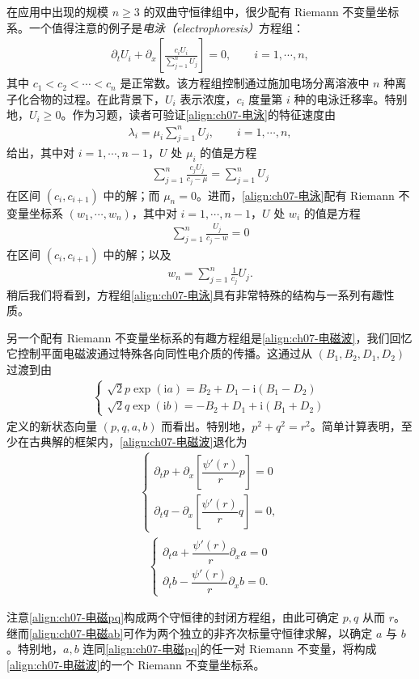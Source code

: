 \documentclass[../../main.tex]{subfiles}
\begin{document}
在应用中出现的规模 $n\geqslant 3$ 的双曲守恒律组中，很少配有 Riemann 不变量坐标系。一个值得注意的例子是\emph{电泳（electrophoresis）}方程组：
\begin{align}
\partial_t U_i+\partial_x\left[\frac{c_i U_i}{\sum_{j=1}^n U_j}\right]=0,\qquad i=1,\cdots,n,
\label{align:ch07-电泳}
\end{align}
其中 $c_1<c_2<\cdots<c_n$ 是正常数。该方程组控制通过施加电场分离溶液中 $n$ 种离子化合物的过程。在此背景下，$U_i$ 表示浓度，$c_i$ 度量第 $i$ 种的电泳迁移率。特别地，$U_i\geqslant 0$。作为习题，读者可验证\eqref{align:ch07-电泳}的特征速度由
\begin{align}
\lambda_i=\mu_i\sum_{j=1}^n U_j,\qquad i=1,\cdots,n,
\label{align:ch07-电泳特征速度}
\end{align}
给出，其中对 $i=1,\cdots,n-1$，$U$ 处 $\mu_i$ 的值是方程
\begin{align}
\sum_{j=1}^n\frac{c_j U_j}{c_j-\mu}=\sum_{j=1}^n U_j
\label{align:ch07-电泳mu方程}
\end{align}
在区间 $(c_i,c_{i+1})$ 中的解；而 $\mu_n=0$。进而，\eqref{align:ch07-电泳}配有 Riemann 不变量坐标系 $(w_1,\cdots,w_n)$，其中对 $i=1,\cdots,n-1$，$U$ 处 $w_i$ 的值是方程
\begin{align}
\sum_{j=1}^n\frac{U_j}{c_j-w}=0
\label{align:ch07-电泳wi方程}
\end{align}
在区间 $(c_i,c_{i+1})$ 中的解；以及
\begin{align}
w_n=\sum_{j=1}^n\frac{1}{c_j}U_j.
\label{align:ch07-电泳wn}
\end{align}
稍后我们将看到，方程组\eqref{align:ch07-电泳}具有非常特殊的结构与一系列有趣性质。

另一个配有 Riemann 不变量坐标系的有趣方程组是\eqref{align:ch07-电磁波}，我们回忆它控制平面电磁波通过特殊各向同性电介质的传播。这通过从 $(B_1,B_2,D_1,D_2)$ 过渡到由
\begin{align}
\begin{cases}
\sqrt{2}p\exp(\mathrm{i}a)=B_2+D_1-\mathrm{i}(B_1-D_2)\\
\sqrt{2}q\exp(\mathrm{i}b)=-B_2+D_1+\mathrm{i}(B_1+D_2)
\end{cases}
\label{align:ch07-电磁复变换}
\end{align}
定义的新状态向量 $(p,q,a,b)$ 而看出。特别地，$p^2+q^2=r^2$。简单计算表明，至少在古典解的框架内，\eqref{align:ch07-电磁波}退化为
\begin{align}
\begin{cases}
\partial_t p+\partial_x\left[\dfrac{\psi'(r)}{r}p\right]=0\\
\partial_t q-\partial_x\left[\dfrac{\psi'(r)}{r}q\right]=0,
\end{cases}
\label{align:ch07-电磁pq}
\end{align}
\begin{align}
\begin{cases}
\partial_t a+\dfrac{\psi'(r)}{r}\partial_x a=0\\
\partial_t b-\dfrac{\psi'(r)}{r}\partial_x b=0.
\end{cases}
\label{align:ch07-电磁ab}
\end{align}

注意\eqref{align:ch07-电磁pq}构成两个守恒律的封闭方程组，由此可确定 $p,q$ 从而 $r$。继而\eqref{align:ch07-电磁ab}可作为两个独立的非齐次标量守恒律求解，以确定 $a$ 与 $b$。特别地，$a,b$ 连同\eqref{align:ch07-电磁pq}的任一对 Riemann 不变量，将构成\eqref{align:ch07-电磁波}的一个 Riemann 不变量坐标系。
\end{document}
